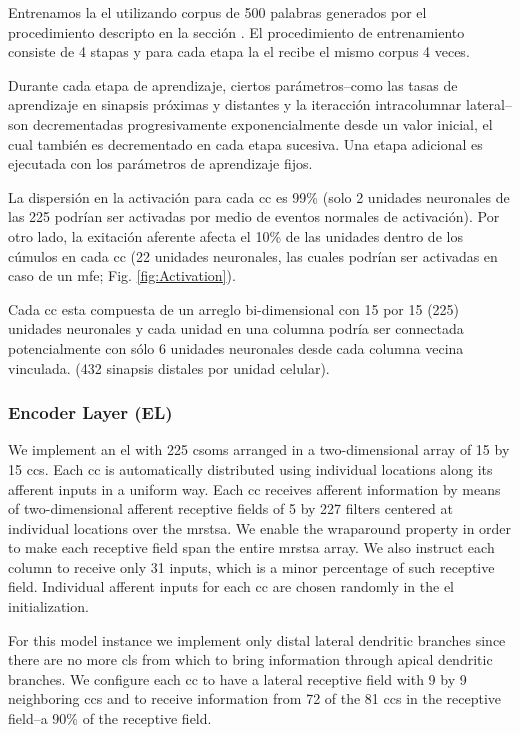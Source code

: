 {Entrenamos la \gls{el} utilizando corpus de 500 palabras generados por el procedimiento descripto en la sección .
El procedimiento de entrenamiento consiste de 4 stapas y para cada etapa la \gls{el} recibe el mismo corpus 4 veces.

Durante cada etapa de aprendizaje, ciertos parámetros--como las tasas de aprendizaje en sinapsis próximas y distantes y la iteracción intracolumnar lateral--son decrementadas progresivamente exponencialmente desde un valor inicial, el cual también es decrementado en cada etapa sucesiva.
Una etapa adicional es ejecutada con los parámetros de aprendizaje fijos.

La dispersión en la activación para cada \gls{cc} es 99\% (solo 2 unidades neuronales de las 225 podrían ser activadas por medio de eventos normales de activación).
Por otro lado, la exitación aferente afecta el 10\% de las unidades dentro de los cúmulos en cada \gls{cc}
(22 unidades neuronales, las cuales podrían ser activadas en caso de un \gls{mfe}; Fig. \ref{fig:Activation}).

Cada \gls{cc} esta compuesta de un arreglo bi-dimensional con 15 por 15 (225) unidades neuronales y
cada unidad en una columna podría ser connectada potencialmente con sólo 6 unidades neuronales desde cada columna vecina vinculada.
(432 sinapsis distales por unidad celular).
}{
\subsubsection{Encoder Layer (EL)}

We implement an \gls{el} with 225 \glspl{csom} arranged in a two-dimensional
array of 15 by 15 \glspl{cc}. Each \gls{cc} is automatically distributed using individual locations along its afferent inputs in a uniform way.
Each \gls{cc} receives afferent information by means of
two-dimensional afferent receptive fields of 5 by 227 filters centered at individual locations over the \gls{mrstsa}.
We enable the wraparound property in order to make each receptive field span the entire
\gls{mrstsa} array.
We also instruct each column to receive only 31 inputs, which is a minor percentage of such
receptive field.
Individual afferent inputs for each \gls{cc} are chosen randomly in the \gls{el} initialization. 

For this model instance we implement only distal lateral dendritic branches since there are
no more \glspl{cl} from which to bring information through apical dendritic branches.
We configure each \gls{cc} to have a lateral receptive field with 9 by 9 neighboring \glspl{cc}
and to receive information from 72 of the 81 \glspl{cc} in the receptive field--a 90\% of the receptive field.

}
